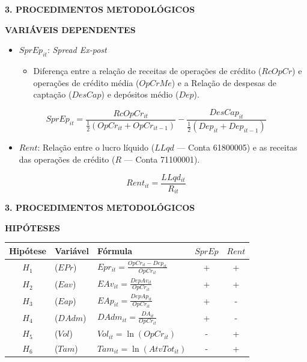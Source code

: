 \documentclass[ignorenonframetext,aspectratio=169,ignorenonframetext]{beamer}
\providecommand{\tightlist}{%
  \setlength{\itemsep}{0pt}\setlength{\parskip}{0pt}}
\begin{document}
\begin{frame}{\textbf{3. PROCEDIMENTOS METODOLÓGICOS}}
\protect\hypertarget{procedimentos-metodoluxf3gicos-8}{}

\textbf{VARIÁVEIS DEPENDENTES}

\begin{itemize}
\tightlist
\item
  \(SprEp_{it}\): \emph{Spread Ex-post}

  \begin{itemize}
  \tightlist
  \item
    Diferença entre a relação de receitas de operações de crédito
    (\(RcOpCr\)) e operações de crédito média (\(OpCrMe\)) e a Relação
    de despesas de captação (\(DesCap\)) e depósitos médio (\(Dep\)).
  \end{itemize}
\end{itemize}

\[
SprEp_{it} = \frac{RcOpCr_{it}}{\frac{1}{2}(OpCr_{it} + OpCr_{it-1}) } - \frac{DesCap_{it}}{\frac{1}{2}(Dep_{it} + Dep_{it-1})}
\]

\begin{itemize}
\tightlist
\item
  \(Rent\): Relação entre o lucro líquido (\(LLqd\) --- Conta 61800005)
  e as receitas das operações de crédito (\(R\) --- Conta 71100001).
\end{itemize}

\[
Rent_{it} = \frac{LLqd_{it}}{R_{it}}
\]

\end{frame}

\begin{frame}{\textbf{3. PROCEDIMENTOS METODOLÓGICOS}}
\protect\hypertarget{procedimentos-metodoluxf3gicos-9}{}

\textbf{HIPÓTESES}

\begin{longtable}[]{@{}cllcc@{}}
\toprule
Hipótese & Variável & Fórmula & \(SprEp\) & \(Rent\)\tabularnewline
\midrule
\endhead
\(H_{1}\) & (\(EPr\)) &
\(Epr_{it} = \frac{OpCr_{it} - Dep_{it}}{OpCr_{it}}\) & + &
+\tabularnewline
\(H_{2}\) & (\(Eav\)) & \(EAv_{it} = \frac{DepAv_{it}}{OpCr_{it}}\) & +
& +\tabularnewline
\(H_{3}\) & (\(Eap\)) & \(EAp_{it} = \frac{DepAp_{it}}{OpCr_{it}}\) & +
& -\tabularnewline
\(H_{4}\) & (\(DAdm\)) & \(DAdm_{it} = \frac{DA_{it}}{OpCr_{it}}\) & + &
-\tabularnewline
\(H_{5}\) & (\(Vol\)) & \(Vol_{it} = \ln(OpCr_{it})\) & - &
+\tabularnewline
\(H_{6}\) & (\(Tam\)) & \(Tam_{it} = \ln(AtvTot_{it})\) & - &
+\tabularnewline
\bottomrule
\end{longtable}

\end{frame}
\end{document}
